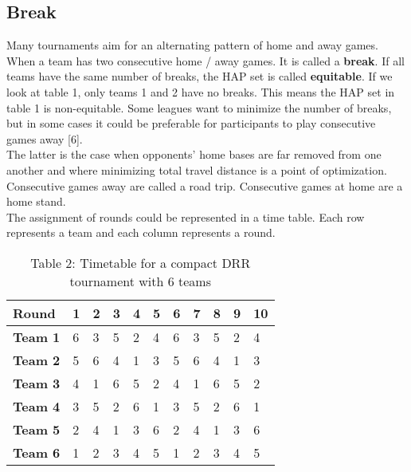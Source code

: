 \subsection{Break}
Many tournaments aim for an alternating pattern of home and away games. When a team has two consecutive home / away games. It is called a \textbf{break}. If all teams have the same number of breaks, the HAP set is called \textbf{equitable}. If we look at table 1, only teams 1 and 2 have no breaks. This means the HAP set in table 1 is non-equitable. Some leagues want to minimize the number of breaks, but in some cases it could be preferable for participants to play consecutive games away [6].
\\[5px]
The latter is the case when opponents’ home bases are far removed from one another and where minimizing total travel distance is a point of optimization. Consecutive games away are called a road trip.  Consecutive games at home are a home stand.
\\[5px]
The assignment of rounds could be represented in a time table. Each row represents a team and each column represents a round.

\begin{table}[!h]
\centering
\begin{tabular}{|l|l|l|l|l|l|l|l|l|l|l|}
\hline
\textbf{Round}  & \textbf{1} & \textbf{2} & \textbf{3} & \textbf{4} & \textbf{5} & \textbf{6} & \textbf{7} & \textbf{8} & \textbf{9} & \textbf{10} \\ \hline
\textbf{Team 1} & 6          & 3          & 5          & 2          & 4          & 6          & 3          & 5          & 2          & 4           \\ \hline
\textbf{Team 2} & 5          & 6          & 4          & 1          & 3          & 5          & 6          & 4          & 1          & 3           \\ \hline
\textbf{Team 3} & 4          & 1          & 6          & 5          & 2          & 4          & 1          & 6          & 5          & 2           \\ \hline
\textbf{Team 4} & 3          & 5          & 2          & 6          & 1          & 3          & 5          & 2          & 6          & 1           \\ \hline
\textbf{Team 5} & 2          & 4          & 1          & 3          & 6          & 2          & 4          & 1          & 3          & 6           \\ \hline
\textbf{Team 6} & 1          & 2          & 3          & 4          & 5          & 1          & 2          & 3          & 4          & 5           \\ \hline
\end{tabular}
\caption{Table 2: Timetable for a compact DRR tournament with 6 teams}
\label{tbl2}
\end{table}

